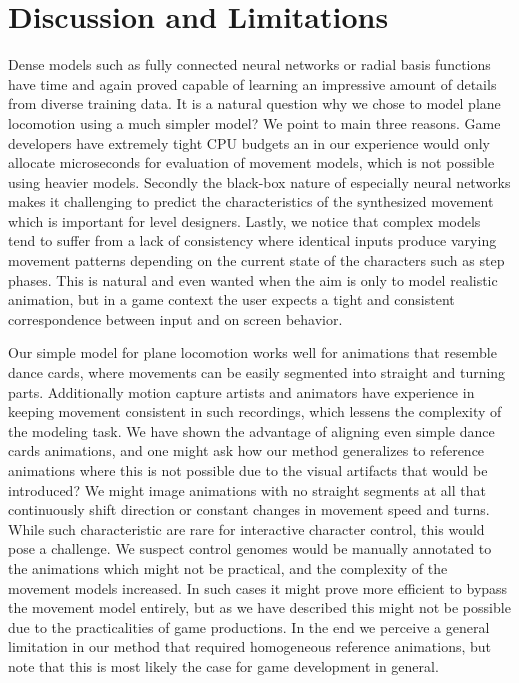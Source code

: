 \section{Discussion and Limitations}

Dense models such as fully connected neural networks or radial basis functions have time and again proved capable of learning an impressive amount of details from diverse training data. It is a natural question why we chose to model plane locomotion using a much simpler model? We point to main three reasons. Game developers have extremely tight CPU budgets an in our experience would only allocate microseconds for evaluation of movement models, which is not possible using heavier models. Secondly the black-box nature of especially neural networks makes it challenging to predict the characteristics of the synthesized movement which is important for level designers.  Lastly, we notice that complex models tend to suffer from a lack of consistency where identical inputs produce varying movement patterns depending on the current state of the characters such as step phases. This is natural and even wanted when the aim is only to model realistic animation, but in a game context the user expects a tight and consistent correspondence between input and on screen behavior. 

Our simple model for plane locomotion works well for animations that resemble dance cards, where movements can be easily segmented into straight and turning parts. Additionally motion capture artists and animators have experience in keeping movement consistent in such recordings, which lessens the complexity of the modeling task. We have shown the advantage of aligning even simple dance cards animations, and one might ask how our method generalizes to reference animations where this is not possible due to the visual artifacts that would be introduced? We might image animations with no straight segments at all that continuously shift direction or constant changes in movement speed and turns. While such characteristic are rare for interactive character control, this would pose a challenge. We suspect control genomes would be manually annotated to the animations which might not be practical, and the complexity of the movement models increased. In such cases it might prove more efficient to bypass the movement model entirely, but as we have described this might not be possible due to the practicalities of game productions. In the end we perceive a general limitation in our method that required homogeneous reference animations, but note that this is most likely the case for game development in general. 


